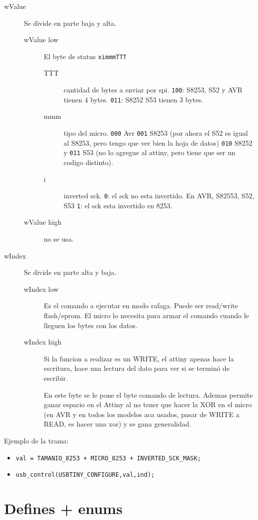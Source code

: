 \documentclass[a4paper,10pt]{article}
\begin{document}
\begin{description}
 \item[wValue] Se divide en parte baja y alta.
 \begin{description}
  \item[wValue low] El byte de status \verb|ximmmTTT|
\begin{description}
 \item[TTT] cantidad de bytes a enviar por spi. \verb|100|: S8253, S52 y AVR
tienen 4 bytes. \verb|011|: S8252 S53 tienen 3 bytes.
\item [mmm] tipo del micro. \verb|000|	Avr \verb|001| S8253 (por ahora el S52
es igual al S8253, pero tengo que ver bien la hoja de datos) \verb|010| S8252 y
\verb|011| S53 (no lo agregue al attiny, pero tiene que ser un codigo distinto).
\item [i] inverted sck. \verb|0|: el sck no esta invertido. En AVR, S82553, S52,
S53 \verb|1|: el sck esta invertido en 8253.
 \end{description}
\item [wValue high] no se usa.
  \end{description}
\item [wIndex] Se divide en parte alta y baja.
\begin{description}
 \item[wIndex low] Es el comando a ejecutar en modo rafaga. Puede ser read/write
flash/eprom. El micro lo necesita para armar el comando cuando le lleguen los
bytes con los datos.
\item [wIndex high] Si la funcion a realizar es un WRITE, el attiny apenas hace
la escritura, hace una lectura del dato para ver si se terminó de escribir.

En este byte se le pone el byte comando de lectura. Ademas permite ganar espacio
en el Attiny al no tener que hacer la XOR en el micro (en AVR y en todos los
modelos aca usados, pasar de WRITE a READ, es hacer una xor) y se gana
generalidad.
 \end{description}
 \end{description}

Ejemplo de la trama:
\begin{itemize}
 \item \verb|val = TAMANIO_8253 + MICRO_8253 + INVERTED_SCK_MASK;|
\item \verb|usb_control(USBTINY_CONFIGURE,val,ind);|
\end{itemize}

\section{Defines + enums}
\end{document}
